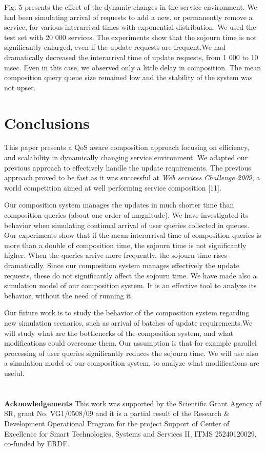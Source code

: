\documentclass[11pt]{llncs}
\begin{document}
Fig. 5 presents the effect of the dynamic changes in the service environment.
We had been simulating arrival of requests to add a new, or permanently remove
a service, for various interarrival times with exponential distribution. We used the
test set with 20 000 services. The experiments show that the sojourn time is not
significantly enlarged, even if the update requests are frequent.We had dramatically
decreased the interarrival time of update requests, from 1 000 to 10 msec. Even in
this case, we observed only a little delay in composition. The mean composition
query queue size remained low and the stability of the system was not upset.

\section{Conclusions}

This paper presents a QoS aware composition approach focusing on efficiency, and
scalability in dynamically changing service environment. We adapted our previous
approach to effectively handle the update requirements. The previous approach
proved to be fast as it was successful at \emph{Web services Challenge 2009}, a world competition
aimed at well performing service composition [11].

Our composition system manages the updates in much shorter time than composition
queries (about one order of magnitude). We have investigated its behavior
when simulating continual arrival of user queries collected in queues. Our experiments
show that if the mean interarrival time of composition queries is more than a
double of composition time, the sojourn time is not significantly higher. When the
queries arrive more frequently, the sojourn time rises dramatically. Since our composition
system manages effectively the update requests, these do not significantly
affect the sojourn time. We have made also a simulation model of our composition
system. It is an effective tool to analyze its behavior, without the need of running it.

Our future work is to study the behavior of the composition system regarding
new simulation scenarios, such as arrival of batches of update requirements.We will
study what are the bottlenecks of the composition system, and what modifications
could overcome them. Our assumption is that for example parallel processing of
user queries significantly reduces the sojourn time. We will use also a simulation
model of our composition system, to analyze what modifications are useful.
\\ \\ \\
\textbf{Acknowledgements} This work was supported by the Scientific Grant Agency of SR, grant No.
VG1/0508/09 and it is a partial result of the Research \& Development Operational Program for the
project Support of Center of Excellence for Smart Technologies, Systems and Services II, ITMS
25240120029, co-funded by ERDF.
\end{document}
